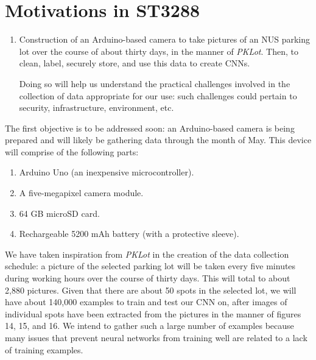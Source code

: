 \documentclass[a4paper, 11pt]{article} %
\begin{document}
\section{Motivations in ST3288}


















	\begin{enumerate}
		\item Construction of an Arduino-based camera to take pictures of an NUS parking lot over the 
		course of about thirty days, in the manner of \textit{PKLot}. Then, to clean, label, securely store, 
		and use this data to create CNNs.
			\begin{adjustwidth}{6mm}{}
				Doing so will help us understand the practical challenges involved in the collection of  
				data appropriate for our use: such challenges could pertain to security, infrastructure, 
				environment,  etc.
			\end{adjustwidth}
		\end{enumerate}
			\newpage
		The first objective is to be addressed soon: an Arduino-based camera is being prepared and will 
		likely be gathering data through the month of May. This device will comprise of the following parts:
		\begin{enumerate}
			\item Arduino Uno (an inexpensive microcontroller).
			\item A five-megapixel camera module.
			\item 64 GB microSD card.
			\item Rechargeable 5200 mAh battery (with a protective sleeve).
		\end{enumerate}

		We have taken inspiration from \textit{PKLot} in the creation of the data collection schedule: a 
		picture of the selected parking lot will be taken every five minutes during working hours over the 
		course of thirty days. This will total to about 2,880 pictures. Given that there are about 50 spots 
		in the selected lot, we will have about 140,000 examples to train and test our CNN on, after images
		of 	individual spots have been extracted from the pictures in the manner of figures 14, 15, and 16. 
		We intend to gather such a large number of examples because many issues that prevent neural 
		networks from training well are related to a lack of training examples.
		
\end{document}
